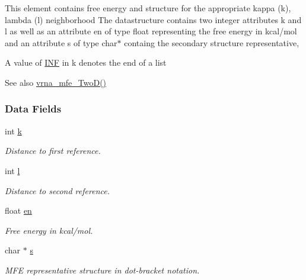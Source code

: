 This element contains free energy and structure for the appropriate kappa (k), lambda (l) neighborhood The datastructure contains two integer attributes \textquotesingle{}k\textquotesingle{} and \textquotesingle{}l\textquotesingle{} as well as an attribute \textquotesingle{}en\textquotesingle{} of type float representing the free energy in kcal/mol and an attribute \textquotesingle{}s\textquotesingle{} of type char$\ast$ containg the secondary structure representative,

A value of \hyperlink{energy__const_8h_a12c2040f25d8e3a7b9e1c2024c618cb6}{I\+NF} in k denotes the end of a list

\begin{DoxySeeAlso}{See also}
\hyperlink{group__kl__neighborhood__mfe_ga243c288b463147352829df04de6a2f77}{vrna\+\_\+mfe\+\_\+\+Two\+D()} 
\end{DoxySeeAlso}
\subsubsection*{Data Fields}
\begin{DoxyCompactItemize}
\item 
\mbox{\label{group__kl__neighborhood__mfe_ac111e850bb3b3a11b6b5707912cfa1b8}} 
int \hyperlink{group__kl__neighborhood__mfe_ac111e850bb3b3a11b6b5707912cfa1b8}{k}
\begin{DoxyCompactList}\small\item\em Distance to first reference. \end{DoxyCompactList}\item 
\mbox{\label{group__kl__neighborhood__mfe_ab8e95cd920901175a2cc8de726ab1d36}} 
int \hyperlink{group__kl__neighborhood__mfe_ab8e95cd920901175a2cc8de726ab1d36}{l}
\begin{DoxyCompactList}\small\item\em Distance to second reference. \end{DoxyCompactList}\item 
\mbox{\label{group__kl__neighborhood__mfe_a7577863a6a84224dfee39b321c03cab1}} 
float \hyperlink{group__kl__neighborhood__mfe_a7577863a6a84224dfee39b321c03cab1}{en}
\begin{DoxyCompactList}\small\item\em Free energy in kcal/mol. \end{DoxyCompactList}\item 
\mbox{\label{group__kl__neighborhood__mfe_ac5942d2505a6cd7e4a8073a321d5d2d5}} 
char $\ast$ \hyperlink{group__kl__neighborhood__mfe_ac5942d2505a6cd7e4a8073a321d5d2d5}{s}
\begin{DoxyCompactList}\small\item\em M\+FE representative structure in dot-\/bracket notation. \end{DoxyCompactList}\end{DoxyCompactItemize}
\label{structTwoDfold__vars}
